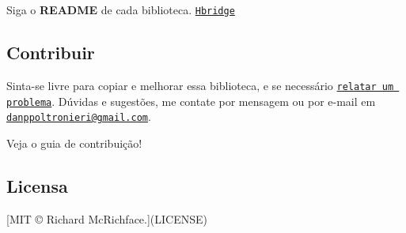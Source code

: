 Siga o {\bfseries R\+E\+A\+D\+ME} de cada biblioteca. \href{/Hbridge/docs/README}{\tt Hbridge}

\subsection*{Contribuir}

Sinta-\/se livre para copiar e melhorar essa biblioteca, e se necessário \href{https://github.com/dpoltronieri/Arduino/issues/new}{\tt relatar um problema}. Dúvidas e sugestões, me contate por mensagem ou por e-\/mail em \href{mailto:danppoltronieri@gmail.com}{\tt danppoltronieri@gmail.\+com}.

Veja o guia de contribuição!

\subsection*{Licensa}

\mbox{[}M\+IT © Richard Mc\+Richface.\mbox{]}(L\+I\+C\+E\+N\+SE) 